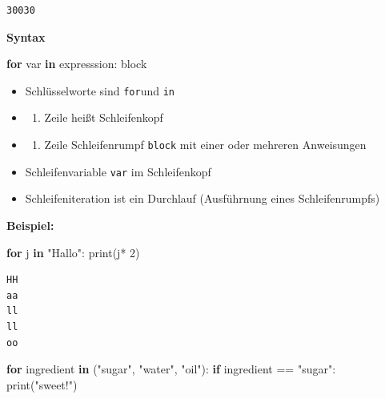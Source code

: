 \documentclass[
  11pt,
  a4paper,
  DIV=11,
  numbers=noendperiod]{scrartcl}
\newenvironment{Shaded}{\begin{snugshade}}{\end{snugshade}}
\newcommand{\BuiltInTok}[1]{\textcolor[rgb]{0.00,0.23,0.31}{#1}}
\newcommand{\ControlFlowTok}[1]{\textcolor[rgb]{0.00,0.23,0.31}{\textbf{#1}}}
\newcommand{\DecValTok}[1]{\textcolor[rgb]{0.68,0.00,0.00}{#1}}
\newcommand{\KeywordTok}[1]{\textcolor[rgb]{0.00,0.23,0.31}{\textbf{#1}}}
\newcommand{\NormalTok}[1]{\textcolor[rgb]{0.00,0.23,0.31}{#1}}
\newcommand{\OperatorTok}[1]{\textcolor[rgb]{0.37,0.37,0.37}{#1}}
\newcommand{\StringTok}[1]{\textcolor[rgb]{0.13,0.47,0.30}{#1}}
\providecommand{\tightlist}{%
  \setlength{\itemsep}{0pt}\setlength{\parskip}{0pt}}
\begin{document}
\begin{verbatim}
30030
\end{verbatim}

\textbf{Syntax}

\begin{Shaded}
\begin{Highlighting}[numbers=left,,]
\ControlFlowTok{for}\NormalTok{ var }\KeywordTok{in}\NormalTok{ expresssion:   }
\NormalTok{        block}
\end{Highlighting}
\end{Shaded}

\begin{itemize}
\tightlist
\item
  Schlüsselworte sind \texttt{for}und \texttt{in}
\item
  \begin{enumerate}
  \def\labelenumi{\arabic{enumi}.}
  \tightlist
  \item
    Zeile heißt Schleifenkopf
  \end{enumerate}
\item
  \begin{enumerate}
  \def\labelenumi{\arabic{enumi}.}
  \setcounter{enumi}{1}
  \tightlist
  \item
    Zeile Schleifenrumpf \texttt{block} mit einer oder mehreren
    Anweisungen
  \end{enumerate}
\item
  Schleifenvariable \texttt{var} im Schleifenkopf
\item
  Schleifeniteration ist ein Durchlauf (Ausführnung eines
  Schleifenrumpfs)
\end{itemize}

\textbf{Beispiel:}

\begin{Shaded}
\begin{Highlighting}[numbers=left,,]
\ControlFlowTok{for}\NormalTok{ j }\KeywordTok{in} \StringTok{"Hallo"}\NormalTok{:}
    \BuiltInTok{print}\NormalTok{(j}\OperatorTok{*} \DecValTok{2}\NormalTok{)}
\end{Highlighting}
\end{Shaded}

\begin{verbatim}
HH
aa
ll
ll
oo
\end{verbatim}

\begin{Shaded}
\begin{Highlighting}[numbers=left,,]
\ControlFlowTok{for}\NormalTok{ ingredient }\KeywordTok{in}\NormalTok{ (}\StringTok{"sugar"}\NormalTok{, }\StringTok{"water"}\NormalTok{, }\StringTok{"oil"}\NormalTok{):}
    \ControlFlowTok{if}\NormalTok{ ingredient }\OperatorTok{==} \StringTok{"sugar"}\NormalTok{:}
        \BuiltInTok{print}\NormalTok{(}\StringTok{"sweet!"}\NormalTok{)}
\end{Highlighting}
\end{Shaded}
\end{document}
